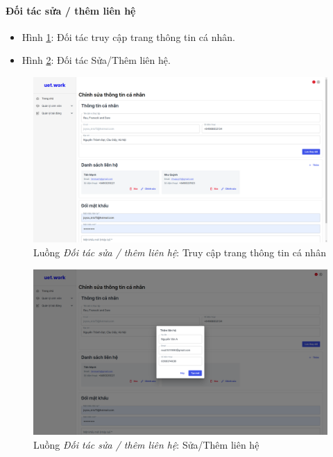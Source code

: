 \documentclass[./../main.tex]{subfiles}
\begin{document}
\paragraph*{Đối tác sửa / thêm liên hệ}

\begin{itemize}
	\item Hình \ref{fig:partner_info_page}: Đối tác truy cập trang thông tin cá nhân. 
	\item Hình \ref{fig:partner_upsert_contact}: Đối tác Sửa/Thêm liên hệ.
\end{itemize}

\begin{figure}[]
	\includegraphics[width=\linewidth]{./images/image48-1.png}
	\caption{Luồng \emph{Đối tác sửa / thêm liên hệ}: Truy cập trang thông tin cá nhân}
	\label{fig:partner_info_page}
\end{figure}

\begin{figure}[]
	\includegraphics[width=\linewidth]{./images/image48.png}
	\caption{Luồng \emph{Đối tác sửa / thêm liên hệ}: Sửa/Thêm liên hệ}
	\label{fig:partner_upsert_contact}
\end{figure}
\end{document}
